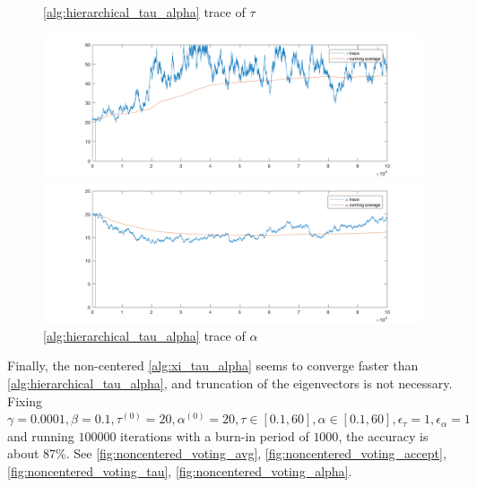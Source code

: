 \documentclass{siamart1116}
\begin{document}
\begin{figure}[!htb]
\begin{minipage}{0.48\textwidth}
    \caption{\label{fig:centered_voting_tau} \cref{alg:hierarchical_tau_alpha} trace of $\tau$}
    \includegraphics[width=\linewidth]{voting/centered/trace_tau.png}
\end{minipage}\hfill
\begin{minipage}{0.48\textwidth}
    \caption{\label{fig:centered_voting_alpha} \cref{alg:hierarchical_tau_alpha} trace of $\alpha$}
    \includegraphics[width=\linewidth]{voting/centered/trace_alpha.png}
\end{minipage}

\end{figure}

Finally, the non-centered \cref{alg:xi_tau_alpha} seems to converge faster than \cref{alg:hierarchical_tau_alpha}, and truncation of the eigenvectors is not necessary. Fixing $\gamma = 0.0001, \beta = 0.1, \tau^{(0)}=20,\alpha^{(0)}=20,\tau\in[0.1,60],\alpha\in[0.1,60],\epsilon_\tau=1,\epsilon_\alpha=1$ and running $100000$ iterations with a burn-in period of $1000$, the accuracy is about 87\%.  See \cref{fig:noncentered_voting_avg}, \cref{fig:noncentered_voting_accept}, \cref{fig:noncentered_voting_tau}, \cref{fig:noncentered_voting_alpha}.
\end{document}
